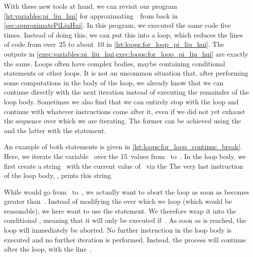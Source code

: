 With these new tools at hand, we can revisit our program \cref{lst:variables:pi_liu_hui} for approximating~\numberPi\ from back in \cref{sec:approximatePiLiuHui}.
In this program, we executed the same code five times.
Instead of doing this, we can put this into a loop, which reduces the lines of code from over~25 to about~10 in \cref{lst:loops:for_loop_pi_liu_hui}.
The outputs in \cref{exec:variables:pi_liu_hui,exec:loops:for_loop_pi_liu_hui} are exactly the same.%
%
\FloatBarrier%
\endhsection%
%
%
%
%
%
%
Loops often have complex bodies, maybe containing conditional statements or other loops.
It is not an uncommon situation that, after performing some computations in the body of the loop, we already know that we can continue directly with the next iteration instead of executing the remainder of the loop body.
Sometimes we also find that we can entirely stop with the loop and continue with whatever instructions come after it, even if we did not yet exhaust the sequence over which we are iterating.
The former can be achieved using the  and the latter with the  statement.

An example of both statements is given in \cref{lst:loops:for_loop_continue_break}.
Here, we iterate the variable~ over the 15~values from~ to~.
In the loop body, we first create a string~ with the current value of~ via the  
The very last instruction of the loop body, , prints this string.

While  would go from~ to~, we actually want to abort the loop as soon as  becomes greater than~.
Instead of modifying the  over which we loop (which would be reasonable), we here want to use the  statement.
We therefore wrap it into the conditional , meaning that it will only be executed if~.
As soon as  is reached, the loop will immediately be aborted.
No further instruction in the loop body is executed and no further iteration is performed.
Instead, the process will continue after the loop, with the line~.

